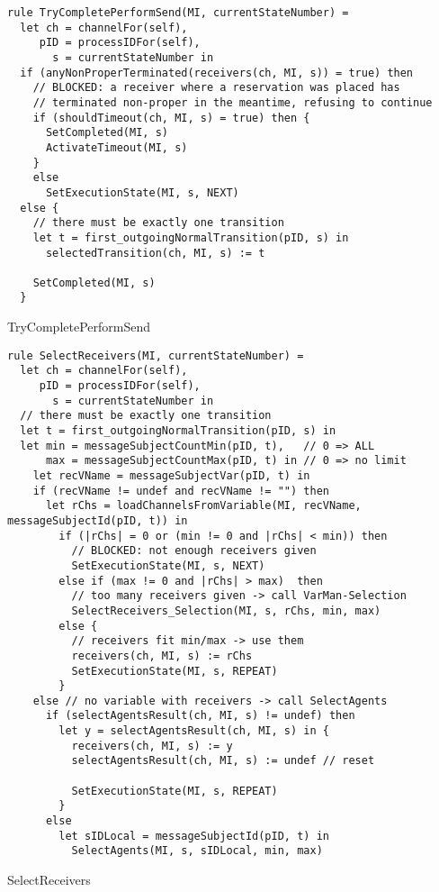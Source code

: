 \begin{listing}[H]
\begin{verbatim}
rule TryCompletePerformSend(MI, currentStateNumber) =
  let ch = channelFor(self),
     pID = processIDFor(self),
       s = currentStateNumber in
  if (anyNonProperTerminated(receivers(ch, MI, s)) = true) then
    // BLOCKED: a receiver where a reservation was placed has
    // terminated non-proper in the meantime, refusing to continue
    if (shouldTimeout(ch, MI, s) = true) then {
      SetCompleted(MI, s)
      ActivateTimeout(MI, s)
    }
    else
      SetExecutionState(MI, s, NEXT)
  else {
    // there must be exactly one transition
    let t = first_outgoingNormalTransition(pID, s) in
      selectedTransition(ch, MI, s) := t

    SetCompleted(MI, s)
  }
\end{verbatim}
\caption{TryCompletePerformSend}
\label{lst:asm:TryCompletePerformSend}
\end{listing}




\begin{listing}[H]
\begin{verbatim}
rule SelectReceivers(MI, currentStateNumber) =
  let ch = channelFor(self),
     pID = processIDFor(self),
       s = currentStateNumber in
  // there must be exactly one transition
  let t = first_outgoingNormalTransition(pID, s) in
  let min = messageSubjectCountMin(pID, t),   // 0 => ALL
      max = messageSubjectCountMax(pID, t) in // 0 => no limit
    let recVName = messageSubjectVar(pID, t) in
    if (recVName != undef and recVName != "") then
      let rChs = loadChannelsFromVariable(MI, recVName, messageSubjectId(pID, t)) in
        if (|rChs| = 0 or (min != 0 and |rChs| < min)) then
          // BLOCKED: not enough receivers given
          SetExecutionState(MI, s, NEXT)
        else if (max != 0 and |rChs| > max)  then
          // too many receivers given -> call VarMan-Selection
          SelectReceivers_Selection(MI, s, rChs, min, max)
        else {
          // receivers fit min/max -> use them
          receivers(ch, MI, s) := rChs
          SetExecutionState(MI, s, REPEAT)
        }
    else // no variable with receivers -> call SelectAgents
      if (selectAgentsResult(ch, MI, s) != undef) then
        let y = selectAgentsResult(ch, MI, s) in {
          receivers(ch, MI, s) := y
          selectAgentsResult(ch, MI, s) := undef // reset

          SetExecutionState(MI, s, REPEAT)
        }
      else
        let sIDLocal = messageSubjectId(pID, t) in
          SelectAgents(MI, s, sIDLocal, min, max)
\end{verbatim}
\caption{SelectReceivers}
\label{lst:asm:SelectReceivers}
\end{listing}





